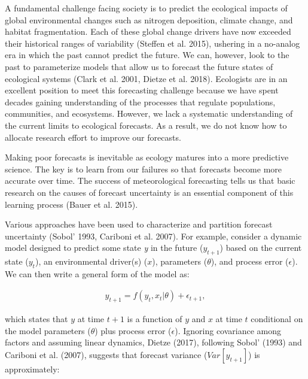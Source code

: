 \documentclass[12pt,]{article}
\begin{document}
A fundamental challenge facing society is to predict the ecological
impacts of global environmental changes such as nitrogen deposition,
climate change, and habitat fragmentation. Each of these global change
drivers have now exceeded their historical ranges of variability
(Steffen et al. 2015), ushering in a no-analog era in which the past
cannot predict the future. We can, however, look to the past to
parameterize models that allow us to forecast the future states of
ecological systems (Clark et al. 2001, Dietze et al. 2018). Ecologists
are in an excellent position to meet this forecasting challenge because
we have spent decades gaining understanding of the processes that
regulate populations, communities, and ecosystems. However, we lack a
systematic understanding of the current limits to ecological forecasts.
As a result, we do not know how to allocate research effort to improve
our forecasts.

Making poor forecasts is inevitable as ecology matures into a more
predictive science. The key is to learn from our failures so that
forecasts become more accurate over time. The success of meteorological
forecasting tells us that basic research on the causes of forecast
uncertainty is an essential component of this learning process (Bauer et
al. 2015).

Various approaches have been used to characterize and partition forecast
uncertainty (Sobol' 1993, Cariboni et al. 2007). For example, consider a
dynamic model designed to predict some state \emph{y} in the future
(\(y_{t+1}\)) based on the current state (\(y_{t}\)), an environmental
driver(s) (\(x\)), parameters (\(\theta\)), and process error
(\(\epsilon\)). We can then write a general form of the model as:

\begin{align}
y_{t+1} = f(y_t, x_t|\theta) + \epsilon_{t+1},
\end{align}

which states that \(y\) at time \(t+1\) is a function of \(y\) and \(x\)
at time \(t\) conditional on the model parameters (\(\theta\)) plus
process error (\(\epsilon\)). Ignoring covariance among factors and
assuming linear dynamics, Dietze (2017), following Sobol' (1993) and
Cariboni et al. (2007), suggests that forecast variance
(\(Var[y_{t+1}]\)) is approximately:
\end{document}
